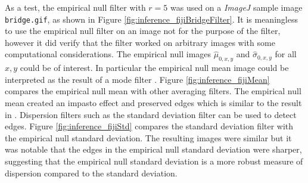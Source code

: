 As a test, the empirical null filter with $r=5$ was used on a \emph{ImageJ} sample image \texttt{bridge.gif}, as shown in Figure \ref{fig:inference_fijiBridgeFilter}. It is meaningless to use the empirical null filter on an image not for the purpose of the filter, however it did verify that the filter worked on arbitrary images with some computational considerations. The empirical null images $\widehat{\mu}_{0,x,y}$ and $\widehat{\sigma}_{0,x,y}$ for all ${x,y}$ could be of interest. In particular the empirical null mean image could be interpreted as the result of a mode filter \citep{griffin2000mean}. Figure \ref{fig:inference_fijiMean} compares the empirical null mean with other averaging filters. The empirical null mean created an impasto effect and preserved edges which is similar to the result in \cite{griffin2000mean}. Dispersion filters such as the standard deviation filter can be used to detect edges. Figure \ref{fig:inference_fijiStd} compares the standard deviation filter with the empirical null standard deviation. The resulting images were similar but it was notable that the edges in the empirical null standard deviation were sharper, suggesting that the empirical null standard deviation is a more robust measure of dispersion compared to the standard deviation.

